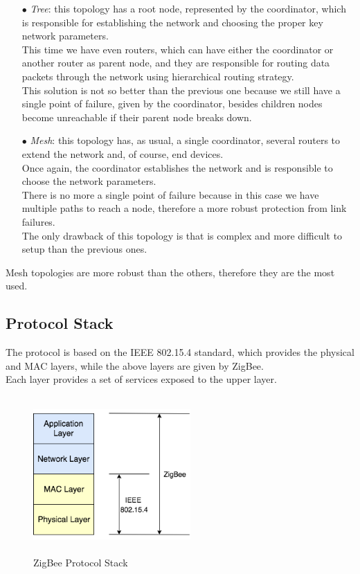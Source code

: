 \documentclass[12pt]{report}
\begin{document}
{{\begin{itemize}
\item[$\bullet$] \emph{Tree}: this topology has a root node, represented by the coordinator, which is responsible for establishing the network and choosing the proper key network parameters.\\
This time we have even routers, which can have either the coordinator or another router as parent node, and they are responsible for routing data packets through the network using hierarchical routing strategy.\\
This solution is not so better than the previous one because we still have a single point of failure, given by the coordinator, besides children nodes become unreachable if their parent node breaks down.

\item[$\bullet$] \emph{Mesh}: this topology has, as usual, a single coordinator, several routers to extend the network and, of course, end devices.\\
Once again, the coordinator establishes the network and is responsible to choose the network parameters.\\
There is no more a single point of failure because in this case we have multiple paths to reach a node, therefore a more robust protection from link failures.\\
The only drawback of this topology is that is complex and more difficult to setup than the previous ones.\\
\end{itemize}

Mesh topologies are more robust than the others, therefore they are the most used.\\

\clearpage
\subsection{Protocol Stack}
\bigskip

The protocol is based on the IEEE 802.15.4 standard, which provides the physical and MAC layers, while the above layers are given by ZigBee.\\
Each layer provides a set of services exposed to the upper layer.

\begin{figure}[H]
\includegraphics[width=6cm,height=6cm,keepaspectratio]{zigbee_stack}
\centering
\caption{ZigBee Protocol Stack}
\end{figure}

}}
\end{document}
